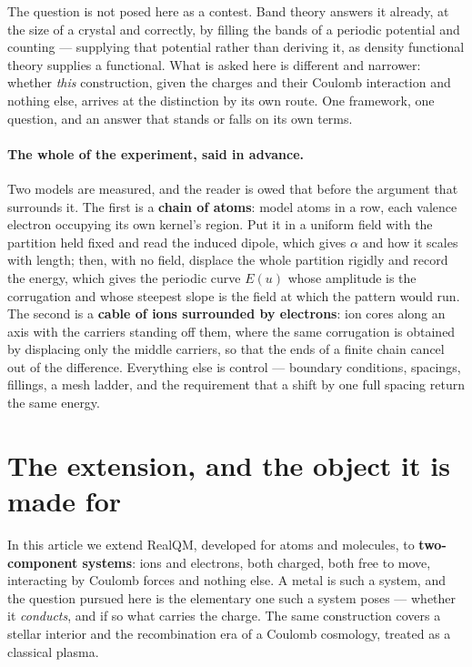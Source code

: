 \documentclass[11pt]{article}
\begin{document}
The question is not posed here as a contest. Band theory answers it already, at the size of a
crystal and correctly, by filling the bands of a periodic potential and counting --- supplying that
potential rather than deriving it, as density functional theory supplies a functional. What is asked
here is different and narrower: whether \emph{this} construction, given the charges and their
Coulomb interaction and nothing else, arrives at the distinction by its own route. One framework, one
question, and an answer that stands or falls on its own terms.

\paragraph{The whole of the experiment, said in advance.} Two models are measured, and the reader is
owed that before the argument that surrounds it. The first is a \textbf{chain of atoms}: model atoms
in a row, each valence electron occupying its own kernel's region. Put it in a uniform field with the
partition held fixed and read the induced dipole, which gives $\alpha$ and how it scales with length;
then, with no field, displace the whole partition rigidly and record the energy, which gives the
periodic curve $E(u)$ whose amplitude is the corrugation and whose steepest slope is the field at
which the pattern would run. The second is a \textbf{cable of ions surrounded by electrons}: ion cores along an axis
with the carriers standing off them, where the same corrugation is obtained by displacing only the
middle carriers, so that the ends of a finite chain cancel out of the difference. Everything else is
control --- boundary conditions, spacings, fillings, a mesh ladder, and the requirement that a shift
by one full spacing return the same energy.
\section{The extension, and the object it is made for}

In this article we extend RealQM, developed for atoms and molecules, to \textbf{two-component
systems}: ions and electrons, both charged, both free to move, interacting by Coulomb forces and
nothing else. A metal is such a system, and the question pursued here is the elementary one such a
system poses --- whether it \emph{conducts}, and if so what carries the charge. The same
construction covers a stellar interior and the recombination era of a Coulomb cosmology, treated as
a classical plasma.
\end{document}
